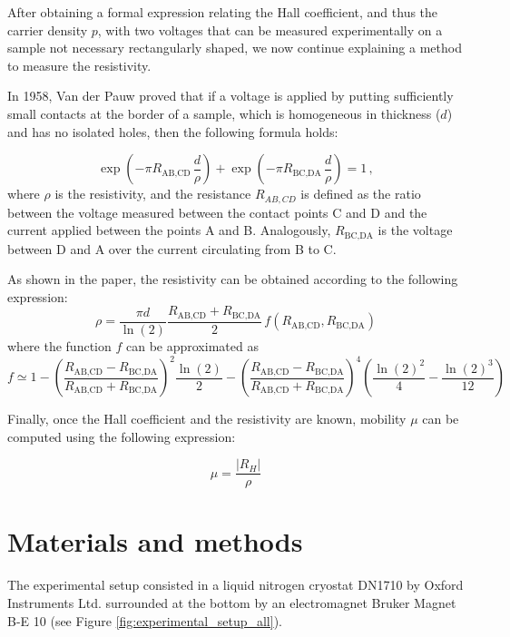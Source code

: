\documentclass[11pt,a4paper]{article}
\begin{document}
After obtaining a formal expression relating the Hall coefficient, and thus the carrier density $p$, with two voltages that can be measured experimentally on a sample not necessary rectangularly shaped, we now continue explaining a method to measure the resistivity.

In 1958, Van der Pauw \cite{vdP} proved that if a voltage is applied by putting sufficiently small contacts at the border of a sample, which is homogeneous in thickness ($d$) and has no isolated holes, then the following formula holds:

\begin{equation}
\exp\left(-\pi R_\text{AB,CD}\,\frac{d}{\rho}\right)+\exp\left(-\pi R_\text{BC,DA}\,\frac{d}{\rho}\right)=1\,,
\end{equation}
where $\rho$ is the resistivity, and the resistance $R_{AB,CD}$ is defined as the ratio between the voltage measured between the contact points C and D and the current applied between the points A and B. Analogously, $R_\text{BC,DA}$ is the voltage between D and A over the current circulating from B to C.

As shown in the paper, the resistivity can be obtained according to the following expression:
\begin{equation}
\rho=\frac{\pi d}{\ln(2)}\frac{R_\text{AB,CD}+R_\text{BC,DA}}{2}\,f\!\left(R_\text{AB,CD},R_\text{BC,DA}\right)
\end{equation}
where the function $f$ can be approximated as
\begin{equation}
f \simeq 1-\left(\frac{R_\text{AB,CD}-R_\text{BC,DA}}{R_\text{AB,CD}+R_\text{BC,DA}}\right)^2 \frac{\ln(2)}{2}-\left(\frac{R_\text{AB,CD}-R_\text{BC,DA}}{R_\text{AB,CD}+R_\text{BC,DA}}\right)^4\left(\frac{\ln(2)^2}{4}-\frac{\ln(2)^3}{12}\right)
\end{equation}

Finally, once the Hall coefficient and the resistivity are known, mobility $\mu$ can be computed using the following expression:

\begin{equation}\label{eq:mobility_exp}
\mu=\frac{|R_H|}{\rho}
\end{equation}

\newpage
\section{Materials and methods}

The experimental setup consisted in a liquid nitrogen cryostat DN1710 by Oxford Instruments Ltd. surrounded at the bottom by an electromagnet Bruker Magnet B-E 10 (see Figure \ref{fig:experimental_setup_all}).
\end{document}
